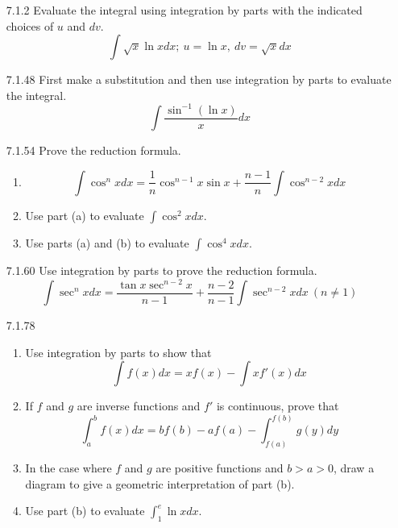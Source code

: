 \documentclass{article}
\begin{document}
\begin{enumerate}
\item[7.1.2]
    Evaluate the integral using integration by parts with the indicated choices of $u$
    and $dv$.
    \[
        \int \sqrt{x} \ln x dx;\ u = \ln x,\ dv = \sqrt{x}dx
    \]

\vspace{5cm}

\item[7.1.48]
    First make a substitution and then use integration by parts to evaluate the integral.
    \[
        \int \frac{\sin^{-1} (\ln x)}{x} dx
    \]

\vspace{5cm}

\item[7.1.54]
    Prove the reduction formula.
    \begin{enumerate}
        \item
        \[
            \int \cos^{n} x dx = \frac{1}{n} \cos^{n-1} x \sin x
            + \frac{n-1}{n}\int \cos^{n-2} x dx
        \]
        \item Use part (a) to evaluate $\displaystyle \int \cos^{2} x dx$.
        \item Use parts (a) and (b) to evaluate $\displaystyle \int \cos^{4} x dx$.
    \end{enumerate}

\newpage

\item[7.1.60]
    Use integration by parts to prove the reduction formula.
    \[
        \int \sec^{n} x dx = \frac{\tan x \sec^{n-2} x }{n-1}
        + \frac{n-2}{n-1}\int \sec^{n-2} x dx\ ( n \neq 1 )
    \]

\vspace{5cm}

\item[7.1.78]
    \begin{enumerate}
        \item Use integration by parts to show that
        \[
            \int f(x) dx = x f(x) - \int xf'(x) dx
        \]
        \item If $f$ and $g$ are inverse functions and $f'$ is
            continuous, prove that
        \[
            \int_{a}^{b} f(x) dx = b f(b) - a f(a) -
            \int_{f(a)}^{f(b)} g(y) dy
        \]
        \item In the case where $f$ and $g$ are positive functions and
            $b > a > 0$, draw a diagram to give a geometric
            interpretation of part (b).
        \item Use part (b) to evaluate $\displaystyle \int_{1}^{e} \ln x dx$.
    \end{enumerate}


\end{enumerate}
\end{document}
